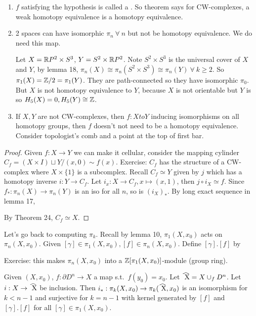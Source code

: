 \documentclass[12pt,class=article,crop=false]{standalone}
\begin{document}
\begin{remark}
\begin{enumerate}[label=(\arabic*)]
	\item $ f$ satisfying the hypothesis is called a  . So theorem says for CW-complexes, a weak homotopy equivalence is a homotopy equivalence.
	\item 2 spaces can have isomorphic $ \pi_n \ \forall \ n$ but not be homotopy equivalence. We do need this map.
		\begin{eg}
		Let $ X = \mathbb{R} P^2 \times S^3$, $ Y = S^2 \times \mathbb{R} P^2$. Note $ S^2 \times S^3$ is the universal cover of $ X$ and  $ Y$, by lemma 18,  $ \pi_n(X) \cong\pi_n(S^2 \times S^3) \cong\pi_n(Y) \ \forall \ k\geq 2$. So $ \pi_1(X)= \mathbb{Z} /2 = \pi_1(Y)$. They are path-connected so they have isomorphic $ \pi_0$. But $ X$ is not homotopy equivalence to  $ Y$, because $ X$ is not orientable but $ Y$ is so $ H_5(X)=0, H_5(Y) \cong \mathbb{Z}$.
		\end{eg}
	\item If $ X,Y$ are not CW-complexes, then  $ f:X to Y$ inducing isomorphisms on all homotopy groups, then  $ f$ doesn't not need to be a homotopy equivalence. Consider topologist's comb and a point at the top of first bar.
\end{enumerate}
\end{remark}

\begin{proof}
Given $ f: X \to Y$ we can make it cellular, consider the mapping cylinder $ C_f= (X \times I) \sqcup Y /(x,0) \sim f(x) $. Exercise: $ C_f$ has the structure of a CW-complex where  $ X \times \{1\} $ is a subcomplex. Recall $ C_f \simeq Y$ given by $ j$ which has a homotopy inverse  $ i:Y \to C_f$. Let $ i_x: X \to C_f,x\mapsto (x,1)$, then $ j \circ i_X \simeq f$. Since $ f_*: \pi_n(X) \to \pi_n(Y)$ is an iso for all $ n$, so is  $ (i_X)_*$. By long exact sequence in lemma 17, 

By Theorem 24,  $ C_f \simeq X$.
\end{proof}

Let's go back to computing $ \pi_k$. Recall by lemma 10, $ \pi_1(X,x_0)$ acts on $ \pi_n(X,x_0)$. Given $ [ \gamma] \in \pi_1(X,x_0), [f] \in \pi_n(X,x_0)$. Define $ [ \gamma]. [f]$ by

Exercise: this makes $ \pi_n(X,x_0)$ into a $\mathbb{Z} [\pi_1(X,x_0)]$-module (group ring).

\begin{thm}
	Given $ (X,x_0)$, $ f: \partial D^{n}\to X$ a map s.t.\ $ f(y_0) = x_0$. Let $ \wh{ X}= X \cup _f D^{n}$. Let $ i: X \to \wh{ X}$ be inclusion. Then $ i_*: \pi_k(X,x_0) \to \pi_k( \wh{ X} ,x_0)$ is an isomorphism for  $ k<n-1$ and surjective for $ k=n-1$ with kernel generated by  $ [f]$ and  $ [ \gamma] . [f]$ for all $ [ \gamma] \in \pi_1(X,x_0)$.
\end{thm}
\end{document}
